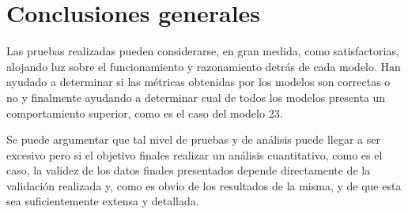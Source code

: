 \section{Conclusiones generales}
Las pruebas realizadas pueden considerarse, en gran medida, como
satisfactorias, alojando luz sobre el funcionamiento y razonamiento detrás de
cada modelo. Han ayudado a determinar si las métricas obtenidas por los modelos
son correctas o no y finalmente ayudando a determinar cual de todos los modelos
presenta un comportamiento superior, como es el caso del modelo 23. 

Se puede argumentar que tal nivel de pruebas y de análisis puede llegar a ser
excesivo pero si el objetivo finales realizar un análisis cuantitativo, como es
el caso, la validez de los datos finales presentados depende directamente de la
validación realizada y, como es obvio de los resultados de la misma, y de que
esta sea suficientemente extensa y detallada. 
